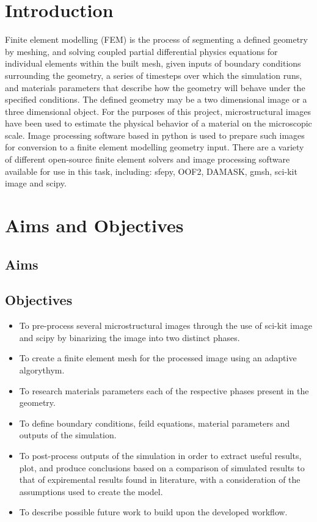 \documentclass[\report.tex]{subfiles}
\begin{document}
\section{Introduction}
Finite element modelling (FEM) is the process of segmenting a defined geometry by meshing, and solving coupled partial differential physics equations for individual elements within the built mesh, given inputs of boundary conditions surrounding the geometry, a series of timesteps over which the simulation runs, and materials parameters that describe how the geometry will behave under the specified conditions. The defined geometry may be a two dimensional image or a three dimensional object. For the purposes of this project, microstructural images have been used to estimate the physical behavior of a material on the microscopic scale. Image processing software based in python is used to prepare such images for conversion to a finite element modelling geometry input. There are a variety of different open-source finite element solvers and image processing software available for use in this task, including: sfepy, OOF2, DAMASK, gmsh, sci-kit image and scipy.

\section{Aims and Objectives}
\subsection{Aims}



\subsection{Objectives}

\begin{itemize}
  \item To pre-process several microstructural images through the use of sci-kit image and scipy by binarizing the image into two distinct phases.
  \item To create a finite element mesh for the processed image using an adaptive algorythym.
  \item To research materials parameters each of the respective phases present in the geometry.
  \item To define boundary conditions, feild equations, material parameters and outputs of the simulation.
  \item To post-process outputs of the simulation in order to extract useful results, plot, and produce conclusions based on a comparison of simulated results to that of expiremental results found in literature, with a consideration of the assumptions used to create the model.
  \item To describe possible future work to build upon the developed workflow.
\end{itemize}
\end{document}
